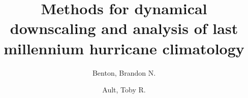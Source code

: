 %
\RequirePackage{fix-cm}
%
%
\documentclass[a4paper]{article}
%
\usepackage{graphicx}
\usepackage{booktabs}
\usepackage{afterpage}
%
%
%
%
%


\title{Methods for dynamical downscaling and analysis of last millennium hurricane climatology}




\author{Benton, Brandon N. \and Ault, Toby R.}



\maketitle

